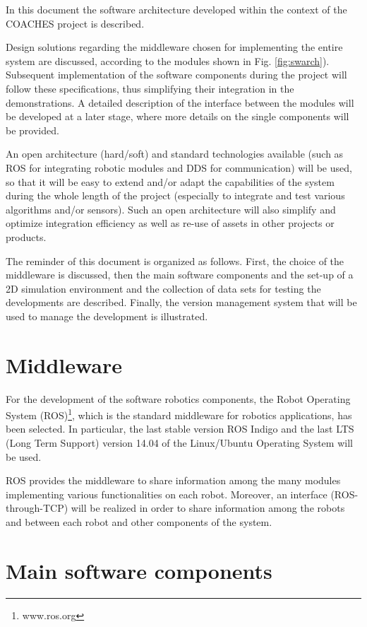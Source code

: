 \documentclass{article}
\begin{document}
In this document the software architecture developed within the
context of the COACHES project is described.

Design solutions regarding the middleware chosen for implementing the entire system are discussed,
according to the modules shown in Fig. \ref{fig:swarch}).
Subsequent implementation of the software components during the project will follow  these  specifications,  thus  simplifying  their  integration  in  the demonstrations. 
A detailed description of the interface between the modules will be developed at a later stage, where more details on the single components will be provided.


An open architecture (hard/soft) and standard technologies available (such 
as ROS for integrating robotic modules and DDS for communication) will be used,
so that it will be 
easy to extend and/or adapt the capabilities of the system during the whole length of 
the  project  (especially  to  integrate  and  test  various  algorithms  and/or  sensors).  Such 
an open architecture will also simplify and optimize integration efficiency as well as re-use of assets in other projects or products. 

The reminder of this document is organized as follows.
First, the choice of the middleware is discussed, then the main software components and the
set-up of a 2D simulation environment and the collection of data sets for testing the developments are described.
Finally, the version management system that will be used to manage the development is illustrated.

\section{Middleware}

For the development of the software robotics components, the Robot Operating System (ROS)\footnote{www.ros.org}, which is the standard middleware for robotics applications, has been selected.
In particular, the last stable version ROS Indigo and the last LTS (Long Term Support) version 14.04 of the Linux/Ubuntu Operating System will be used.

ROS provides the middleware to share information among the many modules implementing various functionalities on each robot. Moreover, an interface (ROS-through-TCP) will be realized in order to share information among the robots and between each robot and other components of the system.

\section{Main software components}
\end{document}
